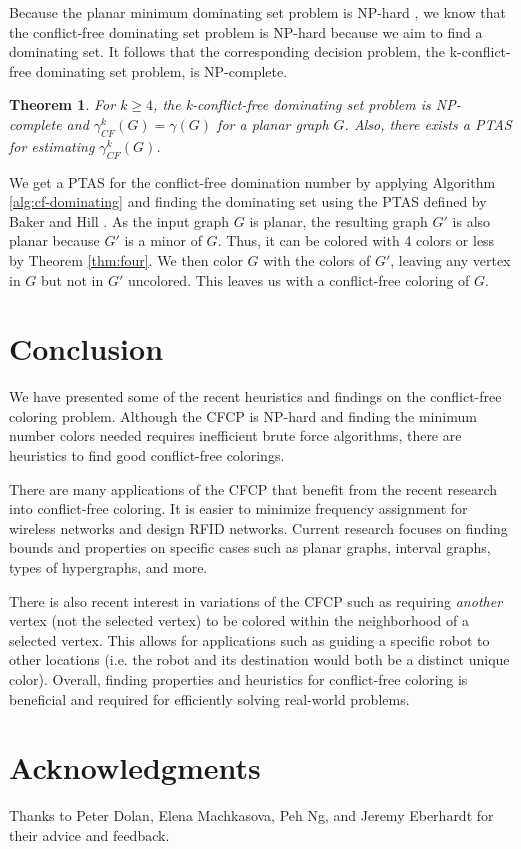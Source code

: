 \documentclass{sig-alternate}
\newtheorem{theorem}{Theorem}
\begin{document}
Because the planar minimum dominating set problem is NP-hard \cite{garey2002computers}, we know that the conflict-free dominating set problem is NP-hard because we aim to find a dominating set. It follows that the corresponding decision problem, the k-conflict-free dominating set problem, is NP-complete.

\begin{theorem} \label{thm:approximate-cfds}
For $k \geq 4$, the k-conflict-free dominating set problem is NP-complete and $\gamma_{CF}^k(G) = \gamma(G)$ for a planar graph $G$. Also, there exists a PTAS for estimating $\gamma_{CF}^k(G)$.
\end{theorem}

We get a PTAS for the conflict-free domination number by applying Algorithm \ref{alg:cf-dominating} and finding the dominating set using the PTAS defined by Baker and Hill \cite{baker1994approximation}. As the input graph $G$ is planar, the resulting graph $G'$ is also planar because $G'$ is a minor of $G$. Thus, it can be colored with 4 colors or less by Theorem \ref{thm:four}. We then color $G$ with the colors of $G'$, leaving any vertex in $G$ but not in $G'$ uncolored. This leaves us with a conflict-free coloring of $G$.

\vspace{-0.1cm}

\section{Conclusion}
\label{sec:conclusion}
We have presented some of the recent heuristics and findings on the conflict-free coloring problem. Although the CFCP is NP-hard and finding the minimum number colors needed requires inefficient brute force algorithms, there are heuristics to find good conflict-free colorings.

There are many applications of the CFCP that benefit from the recent research into conflict-free coloring. It is easier to minimize frequency assignment for wireless networks and design RFID networks. Current research focuses on finding bounds and properties on specific cases such as planar graphs, interval graphs, types of hypergraphs, and more.

There is also recent interest in variations of the CFCP such as requiring \emph{another} vertex (not the selected vertex) to be colored within the neighborhood of a selected vertex. This allows for applications such as guiding a specific robot to other locations (i.e. the robot and its destination would both be a distinct unique color). Overall, finding properties and heuristics for conflict-free coloring is beneficial and required for efficiently solving real-world problems.

\vspace{-0.1cm}


\section{Acknowledgments}
Thanks to Peter Dolan, Elena Machkasova, Peh Ng, and Jeremy Eberhardt for their advice and feedback.



\end{document}
